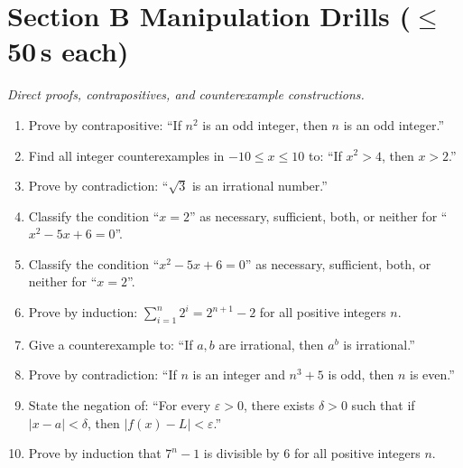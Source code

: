 \documentclass[11pt,a4paper]{article}
\begin{document}
\section*{Section B \quad Manipulation Drills \hfill{\normalfont\small($\leq$50\,s each)}}

\noindent\textit{Direct proofs, contrapositives, and counterexample constructions.}

\begin{enumerate}

\item Prove by contrapositive: ``If $n^2$ is an odd integer, then $n$ is an odd integer.''

\item Find all integer counterexamples in $-10 \le x \le 10$ to: ``If $x^2 > 4$, then $x > 2$.''

\item Prove by contradiction: ``$\sqrt{3}$ is an irrational number.''

\item Classify the condition ``$x=2$'' as necessary, sufficient, both, or neither for ``$x^2 - 5x + 6 = 0$''.

\item Classify the condition ``$x^2 - 5x + 6 = 0$'' as necessary, sufficient, both, or neither for ``$x=2$''.

\item Prove by induction: $\sum_{i=1}^n 2^i = 2^{n+1} - 2$ for all positive integers $n$.

\item Give a counterexample to: ``If $a,b$ are irrational, then $a^b$ is irrational.''

\item Prove by contradiction: ``If $n$ is an integer and $n^3+5$ is odd, then $n$ is even.''

\item State the negation of: ``For every $\varepsilon > 0$, there exists $\delta > 0$ such that if $|x-a| < \delta$, then $|f(x)-L| < \varepsilon$.''

\item Prove by induction that $7^n - 1$ is divisible by $6$ for all positive integers $n$.

\end{enumerate}

\end{document}
